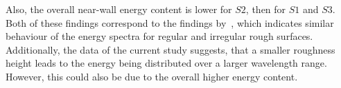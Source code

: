 Also, the overall near-wall energy content is lower for $S2$, then for $S1$ and $S3$.
Both of these findings correspond to the findings by~\cite{chanSecondaryMotionTurbulent2018}, which indicates similar behaviour of the energy spectra for regular and irregular rough surfaces.
Additionally, the data of the current study suggests, that a smaller roughness height leads to the energy being distributed over a larger wavelength range.
However, this could also be due to the overall higher energy content.
